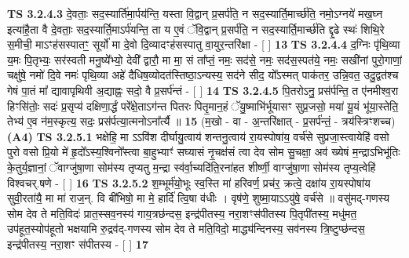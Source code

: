 \documentclass[17pt]{extarticle}
\begin{document}
                                \textbf{ TS 3.2.4.3} \newline
                  दे॒वताः॒ सद॒स्यार्ति॑मा॒र्पय॑न्ति॒ यस्ता वि॒द्वान् प्र॒सर्प॑ति॒ न सद॒स्यार्ति॒मार्च्छ॑ति॒ नमो॒ऽग्नये॑ मख॒घ्न इत्या॑है॒ता वै दे॒वताः॒ सद॒स्यार्ति॒माऽर्प॑यन्ति॒ ता य ए॒वं ॅवि॒द्वान् प्र॒सर्प॑ति॒ न सद॒स्यार्ति॒मार्च्छ॑ति द्दृ॒ढे स्थः॑ शिथि॒रे स॒मीची॒ माऽꣳह॑सस्पातꣳ॒॒ सूर्यो॑ मा दे॒वो दि॒व्यादꣳह॑सस्पातु वा॒युर॒न्तरि॑क्षा - [  ] \textbf{  13} \newline
                  \newline
                                \textbf{ TS 3.2.4.4} \newline
                  द॒ग्निः पृ॑थि॒व्या य॒मः पि॒तृभ्यः॒ सर॑स्वती मनु॒ष्ये᳚भ्यो॒ देवी᳚ द्वारौ॒ मा मा॒ सं ता᳚प्तं॒ नमः॒ सद॑से॒ नमः॒ सद॑स॒स्पत॑ये॒ नमः॒ सखी॑नां पुरो॒गाणां॒ चक्षु॑षे॒ नमो॑ दि॒वे नमः॑ पृथि॒व्या अहे॑ दैधिष॒व्योदत॑स्तिष्ठा॒ऽन्यस्य॒ सद॑ने सीद॒ यो᳚ऽस्मत् पाक॑तर॒ उन्नि॒वत॒ उदु॒द्वत॑श्च गेषं पा॒तं मा᳚ द्यावापृथिवी अ॒द्याह्नः॒ सदो॒ वै प्र॒सर्प॑न्तं - [  ] \textbf{  14} \newline
                  \newline
                                \textbf{ TS 3.2.4.5} \newline
                  पि॒तरोऽनु॒ प्रस॑र्पन्ति॒ त ए॑नमीश्व॒रा हिꣳसि॑तोः॒ सदः॑ प्र॒सृप्य॑ दक्षिणा॒र्द्धं परे᳚क्षे॒ताऽग॑न्त पितरः पितृ॒मान॒हं ॅयु॒ष्माभि॑र्भूयासꣳ सुप्र॒जसो॒ मया॑ यू॒यं भू॑या॒स्तेति॒ तेभ्य॑ ए॒व न॑म॒स्कृत्य॒ सदः॒ प्रस॑र्पत्या॒त्मनोऽना᳚र्त्यै ॥ \textbf{  15} \newline
                  \newline
                      (म॒खो - वा - अ॒न्तरि॑क्षात् - प्र॒सर्प॑न्तं॒ - त्रय॑स्त्रिꣳशच्च)  \textbf{(A4)} \newline \newline
                                        \textbf{ TS 3.2.5.1} \newline
                  भक्षेहि॒ मा ऽऽवि॑श दीर्घायु॒त्वाय॑ शन्तनु॒त्वाय॑ रा॒यस्पोषा॑य॒ वर्च॑से सुप्रजा॒स्त्वायेहि॑ वसो पुरो वसो प्रि॒यो मे॑ हृ॒दो᳚ऽस्य॒श्विनो᳚स्त्वा बा॒हुभ्याꣳ॑ सघ्यासं नृ॒चक्ष॑सं त्वा देव सोम सु॒चक्षा॒ अव॑ ख्येषं म॒न्द्राऽभिभू॑तिः के॒तुर्य॒ज्ञानां॒ ॅवाग्जु॑षा॒णा सोम॑स्य तृप्यतु म॒न्द्रा स्व॑र्वा॒च्यदि॑ति॒रना॑हत शीर्ष्णी॒ वाग्जु॑षा॒णा सोम॑स्य तृप्य॒त्वेहि॑ विश्वचर्.षणे - [  ] \textbf{  16} \newline
                  \newline
                                \textbf{ TS 3.2.5.2} \newline
                  श॒म्भूर्म॑यो॒भूः स्व॒स्ति मा॑ हरिवर्ण॒ प्रच॑र॒ क्रत्वे॒ दक्षा॑य रा॒यस्पोषा॑य सुवी॒रता॑यै॒ मा मा॑ राज॒न्. वि बी॑भिषो॒ मा मे॒ हार्दि॑ त्वि॒षा व॑धीः । वृष॑णे॒ शुष्मा॒याऽऽयु॑षे॒ वर्च॑से ॥ वसु॑मद्-गणस्य सोम देव ते मति॒विदः॑ प्रात॒स्सव॒नस्य॑ गाय॒त्रछ॑न्दस॒ इन्द्र॑पीतस्य॒ नरा॒शꣳस॑पीतस्य पि॒तृपी॑तस्य॒ मधु॑मत॒ उप॑हूत॒स्योप॑हूतो भक्षयामि रु॒द्रव॑द्-गणस्य सोम देव ते मति॒विदो॒ माद्ध्य॑न्दिनस्य॒ सव॑नस्य त्रि॒ष्टुप्छ॑न्दस॒ इन्द्र॑पीतस्य॒ नरा॒शꣳ स॑पीतस्य - [  ] \textbf{  17} \newline
\end{document}
